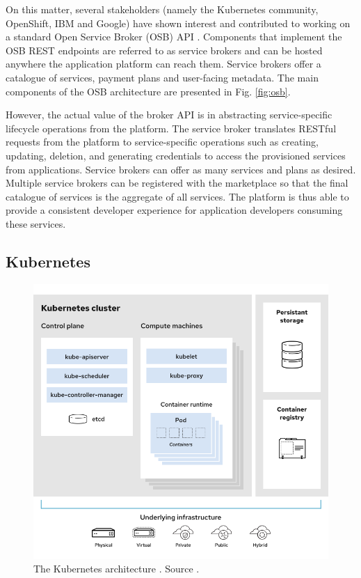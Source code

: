 On this matter, several stakeholders (namely the Kubernetes community, OpenShift, IBM and Google) have shown interest and contributed to working on a standard Open Service Broker (OSB) API \cite{osb}. Components that implement the OSB REST endpoints are referred to as service brokers and can be hosted anywhere the application platform can reach them. Service brokers offer a catalogue of services, payment plans and user-facing metadata. The main components of the OSB architecture are presented in Fig. \ref{fig:osb}.

However, the actual value of the broker API is in abstracting service-specific lifecycle operations from the platform. The service broker translates RESTful requests from the platform to service-specific operations such as creating, updating, deletion, and generating credentials to access the provisioned services from applications. Service brokers can offer as many services and plans as desired. Multiple service brokers can be registered with the marketplace so that the final catalogue of services is the aggregate of all services. The platform is thus able to provide a consistent developer experience for application developers consuming these services.

\subsection{Kubernetes}
\label{sec:kubernetes}

\begin{figure}[ht]
\centering
\includegraphics[width=\columnwidth]{figures/kubernetes}
\caption{The Kubernetes architecture \label{fig:kubernetes}. Source \cite{k8s-architecture}.}
\end{figure}

